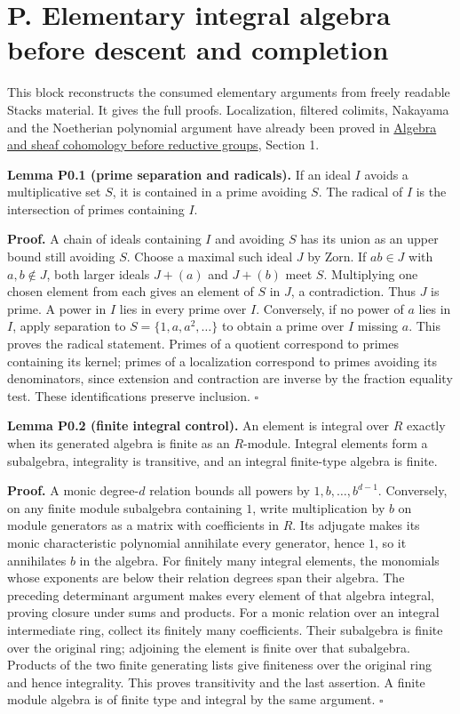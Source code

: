 \documentclass[11pt,a4paper,openany]{report}
\begin{document}
\section{P. Elementary integral algebra before descent and completion}\label{AG-RG-S04-p.-elementary-integral-algebra-before-descent-and-completion}

This block reconstructs the consumed elementary arguments from freely readable Stacks material. It gives the full proofs. Localization, filtered colimits, Nakayama and the Noetherian polynomial argument have already been proved in \href{https://github.com/KokunoYumeto/open-math-courses/blob/main/docs/courses/AG-RG/AG-RG-S01.md}{Algebra and sheaf cohomology before reductive groups}, Section 1.

\textbf{Lemma P0.1 (prime separation and radicals).} If an ideal \(I\) avoids a multiplicative set \(S\), it is contained in a prime avoiding \(S\). The radical of \(I\) is the intersection of primes containing \(I\).

\textbf{Proof.} A chain of ideals containing \(I\) and avoiding \(S\) has its union as an upper bound still avoiding \(S\). Choose a maximal such ideal \(J\) by Zorn. If \(ab\in J\) with \(a,b\notin J\), both larger ideals \(J+(a)\) and \(J+(b)\) meet \(S\). Multiplying one chosen element from each gives an element of \(S\) in \(J\), a contradiction. Thus \(J\) is prime. A power in \(I\) lies in every prime over \(I\). Conversely, if no power of \(a\) lies in \(I\), apply separation to \(S=\{1,a,a^2,\ldots\}\) to obtain a prime over \(I\) missing \(a\). This proves the radical statement. Primes of a quotient correspond to primes containing its kernel; primes of a localization correspond to primes avoiding its denominators, since extension and contraction are inverse by the fraction equality test. These identifications preserve inclusion. \(\square\)

\textbf{Lemma P0.2 (finite integral control).} An element is integral over \(R\) exactly when its generated algebra is finite as an \(R\)-module. Integral elements form a subalgebra, integrality is transitive, and an integral finite-type algebra is finite.

\textbf{Proof.} A monic degree-\(d\) relation bounds all powers by \(1,b,\ldots,b^{d-1}\). Conversely, on any finite module subalgebra containing \(1\), write multiplication by \(b\) on module generators as a matrix with coefficients in \(R\). Its adjugate makes its monic characteristic polynomial annihilate every generator, hence \(1\), so it annihilates \(b\) in the algebra. For finitely many integral elements, the monomials whose exponents are below their relation degrees span their algebra. The preceding determinant argument makes every element of that algebra integral, proving closure under sums and products. For a monic relation over an integral intermediate ring, collect its finitely many coefficients. Their subalgebra is finite over the original ring; adjoining the element is finite over that subalgebra. Products of the two finite generating lists give finiteness over the original ring and hence integrality. This proves transitivity and the last assertion. A finite module algebra is of finite type and integral by the same argument. \(\square\)
\end{document}
